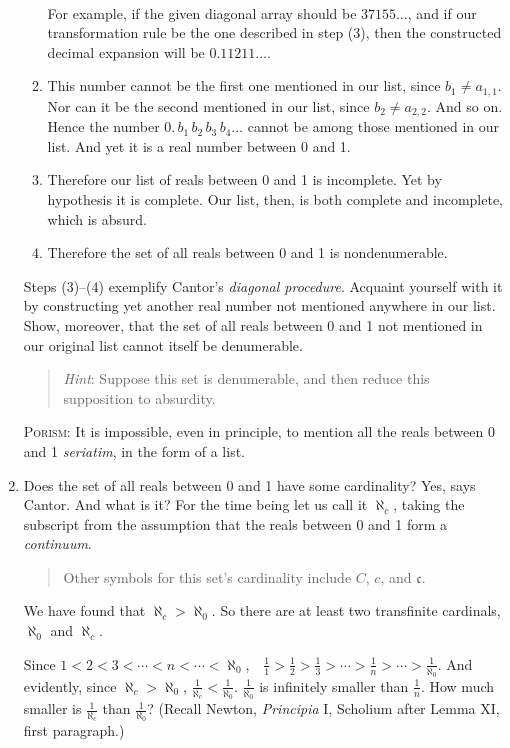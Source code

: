 \documentclass[twoside,openright]{article}
\begin{document}
\begin{enumerate}
\begin{enumerate}[(1)]
\begin{align*}
  \end{align*}
  For example, if the given diagonal array should be $37155\dotsc$,
  and if our transformation rule be the one described in step (3),
  then the constructed decimal expansion will be $0.11211\dotsc$.
\item This number cannot be the first one mentioned in our list, since
  $b_1\neq a_{1,1}.$ Nor can it be the second mentioned in our list,
  since $b_2\neq a_{2,2}.$ And so on. Hence the number
  $0.\,b_1\,b_2\,b_3\,b_4\dotsc$ cannot be among those mentioned in
  our list. And yet it is a real number between 0 and 1.
\item Therefore our list of reals between 0 and 1 is incomplete. Yet
  by hypothesis it is complete. Our list, then, is both complete and
  incomplete, which is absurd.
\item Therefore the set of all reals between 0 and 1 is
  nondenumerable.
\end{enumerate}
Steps (3)--(4) exemplify Cantor's \emph{diagonal procedure}. Acquaint
yourself with it by constructing yet another real number not mentioned
anywhere in our list. Show, moreover, that the set of all reals
between 0 and 1 not mentioned in our original list cannot itself be
denumerable.
\begin{quote} {\small \emph{Hint}: Suppose this set is denumerable,
    and then reduce this supposition to absurdity.}
\end{quote}
\textsc{Porism}: It is impossible, even in principle, to mention all
the reals between 0 and 1 \emph{seriatim}, in the form of a list.
\item \label{reals}Does the set of all reals between 0 and 1 have some
  cardinality? Yes, says Cantor. And what is it? For the time being
  let us call it $\aleph_{c}$, taking the subscript from the
  assumption that the reals between 0 and 1 form a \emph{continuum}.
  \begin{quote} {\small Other symbols for this set's cardinality
      include $C$, $c$, and $\mathfrak{c}$.}
  \end{quote}
  We have found that $\aleph_{c}>\aleph_{0}$.\label{inequalityalephs}
  So there are at least two transfinite cardinals, $\aleph_{0}$ and
  $\aleph_{c}$.

  Since $1<2<3<\dotsb<n<\dotsb<\aleph_{0}$,\ \
  \label{smallesttransfinite}$\frac{1}{1}>\frac{1}{2}>\frac{1}{3}>\dotsb>\frac{1}{n}>\dotsb>\frac{1}{\aleph_{0}}$.
  And
  evidently, since $\aleph_{c}>\aleph_{0}$,
  $\frac{1}{\aleph_{c}}<\frac{1}{\aleph_{0}}$. $\frac{1}{\aleph_{0}}$
  is infinitely smaller than $\frac{1}{n}$. How much smaller is
  $\frac{1}{\aleph_c}$ than $\frac{1}{\aleph_{0}}$? (Recall Newton,
  \emph{Principia} I, Scholium after Lemma XI, first paragraph.)


\end{enumerate}
\end{document}

